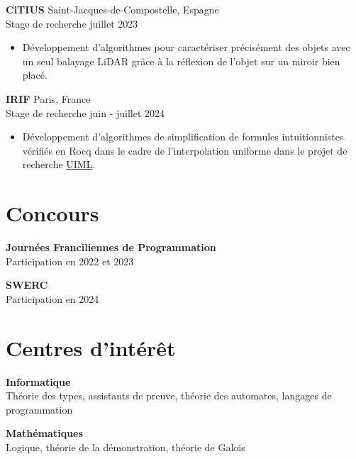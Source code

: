 \documentclass[12pt]{article}
\newcommand{\entry}[4]{{{\textbf{#1}}} \hfill #3 \\ #2 \hfill #4}
\begin{document}
\begin{paracol}{2}
	\entry{CiTIUS}{Stage de recherche}{Saint-Jacques-de-Compostelle, Espagne}{juillet 2023}
	\begin{itemize}[noitemsep,leftmargin=3.5mm,rightmargin=0mm,topsep=6pt]
		\item Développement d'algorithmes pour caractériser précisément des objets avec un seul balayage LiDAR grâce à la réflexion de l'objet sur un miroir bien placé.
	\end{itemize}



	\entry{IRIF}{Stage de recherche}{Paris, France}{juin - juillet 2024}
	\begin{itemize}[noitemsep,leftmargin=3.5mm,rightmargin=0mm,topsep=6pt]
        \item Développement d'algorithmes de simplification de formules intuitionnistes vérifiés en Rocq dans le cadre de l'interpolation
            uniforme dans le projet de recherche \href{https://github.com/hferee/UIML}{UIML}\cite{feree:hal-04859429}.
	\end{itemize}


	\switchcolumn

	\section{Concours}


	\textbf{Journées Franciliennes de Programmation}\\
	\noindent Participation en 2022 et 2023

	\textbf{SWERC}\\
	\noindent Participation en 2024


\end{paracol}


\section{Centres d'intérêt}


\begin{paracol}{2}

	\entry{Informatique}{Théorie des types, assistants de preuve, théorie des automates,
        langages de programmation}{ }{ }

	\switchcolumn


	\entry{Mathématiques}{Logique, théorie de la démonstration, théorie de Galois}{ }{ }
\end{paracol}


\newpage %
\end{document}
